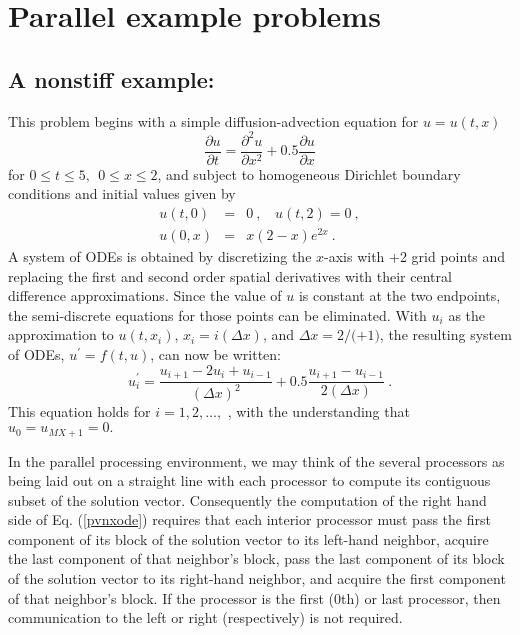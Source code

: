 \section{Parallel example problems}\label{s:ex_parallel}

\subsection{A nonstiff example: }\label{ss:pvnx}

This problem begins with a simple diffusion-advection equation
for $u=u(t,x)$
\begin{equation}
\frac{\partial u}{\partial t}=\frac{\partial ^{2}u}{\partial x^{2}}
   + 0.5\frac{\partial u}{\partial x}  \label{PDE1}
\end{equation}
for $0 \leq t \leq 5, ~~ 0\leq x \leq 2$, and subject to homogeneous
Dirichlet boundary conditions and initial values given by 
\begin{eqnarray}
u(t,0) &=& 0 ~,~~~~u(t,2) = 0 ~, \label{BCIC1} \\
u(0,x) &=& x(2-x)e^{2x} ~. \nonumber
\end{eqnarray}
A system of  ODEs is obtained by discretizing the $x$-axis with +2
grid points and replacing the first and second order spatial derivatives
with their central difference approximations. Since the value of $u$ is
constant at the two endpoints, the semi-discrete equations for those points
can be eliminated.  With $u_{i}$ as the approximation to $u(t,x_{i})$, 
$x_{i} = i(\Delta x)$, and $\Delta x = 2/($$+1)$, the resulting system of
ODEs, $u^\prime = f(t,u)$, can now be written:
\begin{equation}
u^\prime_i=\frac{u_{i+1}-2u_{i}+u_{i-1}}{(\Delta x)^{2}}
  + 0.5 \frac{u_{i+1}-u_{i-1}}{2(\Delta x)} ~. \label{pvnxode}
\end{equation}
This equation holds for $i=1,2,\ldots ,$ , with the understanding
that $u_{0} = u_{MX+1}=0.$

In the parallel processing environment, we may think of the several
processors as being laid out on a straight line with each processor to
compute its contiguous subset of the solution vector.  Consequently
the computation of the right hand side of Eq. (\ref{pvnxode}) requires
that each interior processor must pass the first component of its block of
the solution vector to its left-hand neighbor, acquire the last component of
that neighbor's block, pass the last component of its block of the solution
vector to its right-hand neighbor, and acquire the first component of that
neighbor's block. If the processor is the first ($0$th) or last processor,
then communication to the left or right (respectively) is not required.

